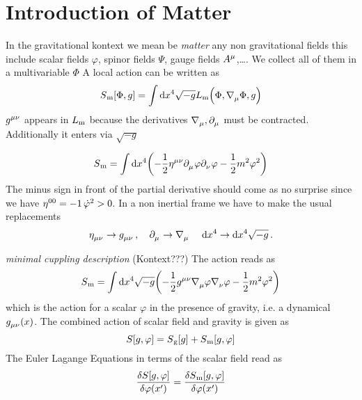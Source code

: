 \section{Introduction of Matter}
In the gravitational kontext we mean be \emph{matter} any non gravitational
fields this include scalar fields $\varphi$, spinor fields $\Psi$, gauge fields
$\tensor{A}{^\mu}$,\dots. We collect all of them in a multivariable $\Phi$
A local action can be written as
\begin{equation}
S\textsubscript{m}[\Phi,g]=\int \dif x^4\sqrt{-g}
L\textsubscript{m}\left(\Phi,\tensor{\nabla}{_\mu}\Phi,g\right)
\end{equation}
$\tensor{g}{^\mu^\nu}$ appears in $L\textsubscript{m}$ because the derivatives
$\tensor{\nabla}{_\mu}, \tensor{\partial}{_\mu}$ must be contracted.
Additionally it enters via $\sqrt{-g}$
\begin{example}
\begin{equation}
S\textsubscript{m}=\int \dif x^4 \left(-\frac{1}{2}\tensor{\eta}{^\mu^\nu}
\tensor{\partial}{_\mu}\varphi\tensor{\partial}{_\nu}\varphi-\frac{1}{2}m^2\varphi^2\right)
\end{equation}
The minus sign in front of the partial derivative should come as no surprise
since we have $\tensor{\eta}{^0^0}=-1\, \dot{\varphi}^2>0$. In a non inertial
frame we have to make the usual replacements
\begin{equation}
\tensor{\eta}{_\mu_\nu}\to \tensor{g}{_\mu_\nu}\, , \quad
\tensor{\partial}{_\mu}\to
\tensor{\nabla}{_\mu}\, \quad \dif x^4\to \dif x^4\sqrt{-g}\, .
\end{equation}
\end{example}
\emph{minimal cuppling description} (Kontext???) The action reads as
\begin{equation}
S\textsubscript{m}=\int \dif x^4 \sqrt{-g}\left(-\frac{1}{2}\tensor{g}{^\mu^\nu}
\tensor{\nabla}{_\mu}\varphi\tensor{\nabla}{_\nu}\varphi-\frac{1}{2}m^2\varphi^2\right)
\end{equation}
which is the action for a scalar $\varphi$ in the presence of gravity, i.e. a
dynamical $\tensor{g}{_\mu_\nu}(x)$. The combined action of scalar field and
gravity is given as
\begin{equation}
S[g,\varphi]=S\textsubscript{g}[g]+S\textsubscript{m}[g,\varphi]
\end{equation}
The Euler Lagange Equations in terms of the scalar field read as
\begin{equation}
\frac{\delta S[g,\varphi]}{\delta
\varphi\left(x'\right)}=\frac{\delta S\textsubscript{m}[g,\varphi]}{\delta \varphi\left(x'\right)}
\end{equation}


